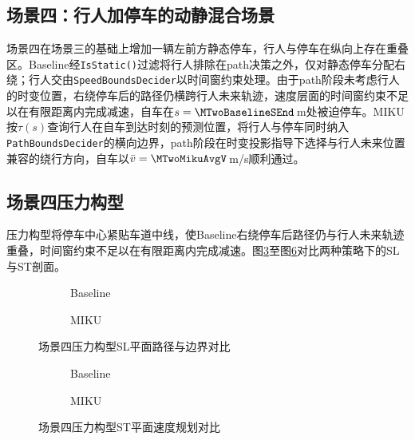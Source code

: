 \subsection{场景四：行人加停车的动静混合场景}

场景四在场景三的基础上增加一辆左前方静态停车，行人与停车在纵向上存在重叠区。Baseline经\texttt{IsStatic()}过滤将行人排除在path决策之外，仅对静态停车分配右绕；行人交由\texttt{SpeedBoundsDecider}以时间窗约束处理。由于path阶段未考虑行人的时变位置，右绕停车后的路径仍横跨行人未来轨迹，速度层面的时间窗约束不足以在有限距离内完成减速，自车在$s=\MTwoBaselineSEnd$\,m处被迫停车。MIKU按$\tau(s)$查询行人在自车到达时刻的预测位置，将行人与停车同时纳入\texttt{PathBoundsDecider}的横向边界，path阶段在时变投影指导下选择与行人未来位置兼容的绕行方向，自车以$\bar{v}=\MTwoMikuAvgV$\,m/s顺利通过。

\subsection{场景四压力构型}

压力构型将停车中心紧贴车道中线，使Baseline右绕停车后路径仍与行人未来轨迹重叠，时间窗约束不足以在有限距离内完成减速。图\ref{fig:exp_ch7_pressure_sl_2}至图\ref{fig:exp_ch7_pressure_st_2}对比两种策略下的SL与ST剖面。

\begin{figure}[H]
\centering
\begin{subfigure}[b]{\textwidth}
  \centering
  
  \caption{Baseline}
  \label{fig:exp_ch7_pressure_sl_2:a}
\end{subfigure}

\begin{subfigure}[b]{\textwidth}
  \centering
  
  \caption{MIKU}
  \label{fig:exp_ch7_pressure_sl_2:b}
\end{subfigure}
\caption{场景四压力构型SL平面路径与边界对比}
\label{fig:exp_ch7_pressure_sl_2}
\end{figure}

\begin{figure}[H]
\centering
\begin{subfigure}[b]{0.48\textwidth}
  \centering
  
  \caption{Baseline}
  \label{fig:exp_ch7_pressure_st_2:a}
\end{subfigure}\hfill
\begin{subfigure}[b]{0.48\textwidth}
  \centering
  
  \caption{MIKU}
  \label{fig:exp_ch7_pressure_st_2:b}
\end{subfigure}
\caption{场景四压力构型ST平面速度规划对比}
\label{fig:exp_ch7_pressure_st_2}
\end{figure}

